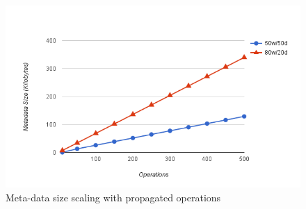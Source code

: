 \begin{figure}[H]
\centering
\includegraphics[scale=0.7]{files/chart3.png}
\caption{Meta-data size scaling with propagated operations}
\label{chart3}
\end{figure}

